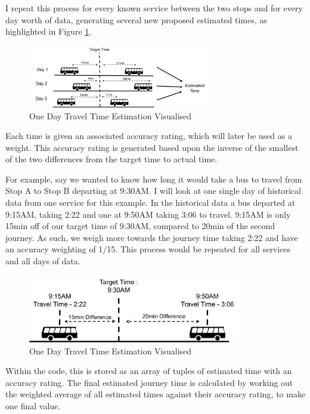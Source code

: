 \documentclass{article}
\begin{document}
\par 
I repeat this process for every known service between the two stops and for every day worth of data, generating several new proposed estimated times, as highlighted in Figure \ref{fig:travelTimeDay}.

\begin{figure}[H]
	\centering
	\includegraphics[width=300px]{images/travelTimeDay.png}
	\caption{One Day Travel Time Estimation Visualised}
	\label{fig:travelTimeDay}
\end{figure}


\par
Each time is given an associated accuracy rating, which will later be used as a weight. This accuracy rating is generated based upon the inverse of the smallest of the two differences from the target time to actual time. 

\par
For example, say we wanted to know how long it would take a bus to travel from Stop A to Stop B departing at 9:30AM. I will look at one single day of historical data from one service for this example. In the historical data a bus departed at 9:15AM, taking 2:22 and one at 9:50AM taking 3:06 to travel. 9:15AM is only 15min off of our target time of 9:30AM, compared to 20min of the second journey. As such, we weigh more towards the journey time taking 2:22 and have an accuracy weighting of 1/15. This process would be repeated for all services and all days of data.

\begin{figure}[H]
	\centering
	\includegraphics[width=350px]{images/travelTime.png}
	\caption{One Day Travel Time Estimation Visualised}
	\label{fig:travelTime}
\end{figure}


\par 
Within the code, this is stored as an array of tuples of estimated time with an accuracy rating. The final estimated journey time is calculated by working out the weighted average of all estimated times against their accuracy rating, to make one final value. 
\end{document}
